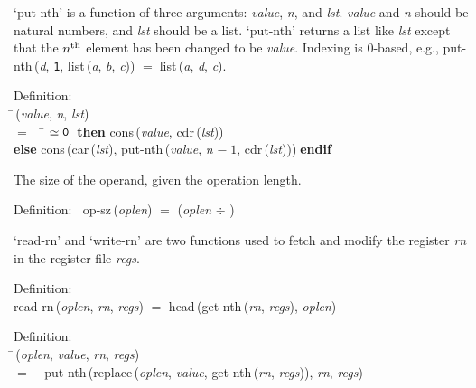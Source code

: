  `put-nth' is a function of three arguments: {\it{value\/}}, {\it{n\/}}, and {\it{lst\/}}.
 {\it{value\/}} and {\it{n\/}} should be natural numbers, and {\it{lst\/}} should be
 a list.  `put-nth' returns a list like {\it{lst\/}} except that the $n^{\rm th}$
 element has been changed to be {\it{value\/}}.  Indexing is 0-based,
 e.g., {\rm{put-nth}}\,({\it{d\/}}, {\tt{1}}, {\rm{list}}\,({\it{a\/}}, {\it{b\/}}, {\it{c\/}})) $=$$\;${\rm{list}}\,({\it{a\/}}, {\it{d\/}}, {\it{c\/}}).
\begin{tabbing}{\sc Definition}: \\  
\=\,({\it{value\/}}, {\it{n\/}}, {\it{lst\/}}) \\ 
$=$$\;\;\;\;$\= $\simeq {\tt{0}}$$\;\;${\bf then }{\rm{cons}}\,({\it{value\/}}, {\rm{cdr}}\,({\it{lst\/}})) \\ 
{\bf else }{\rm{cons}}\,({\rm{car}}\,({\it{lst\/}}), {\rm{put-nth}}\,({\it{value\/}}, {\it{n\/}} $-\;1$, {\rm{cdr}}\,({\it{lst\/}})))$\;${\bf  endif}\-\-
\end{tabbing}

 The size of the operand, given the operation length.
\begin{tabbing}{\sc Definition}:$\;\;$
{\rm{op-sz}}\,({\it{oplen\/}}) $=$ ({\it{oplen\/}} $\div$ {})
\end{tabbing}

 `read-rn' and `write-rn' are two functions used to fetch and modify
 the register {\it{rn\/}} in the register file {\it{regs\/}}.
\begin{tabbing}{\sc Definition}: \\  
{\rm{read-rn}}\,({\it{oplen\/}}, {\it{rn\/}}, {\it{regs\/}}) $=$ {\rm{head}}\,({\rm{get-nth}}\,({\it{rn\/}}, {\it{regs\/}}), {\it{oplen\/}})
\end{tabbing}

\begin{tabbing}{\sc Definition}: \\  
\=\,({\it{oplen\/}}, {\it{value\/}}, {\it{rn\/}}, {\it{regs\/}}) \\ 
$=$$\;\;\;\;${\rm{put-nth}}\,({\rm{replace}}\,({\it{oplen\/}}, {\it{value\/}}, {\rm{get-nth}}\,({\it{rn\/}}, {\it{regs\/}})), {\it{rn\/}}, {\it{regs\/}})\-
\end{tabbing}

